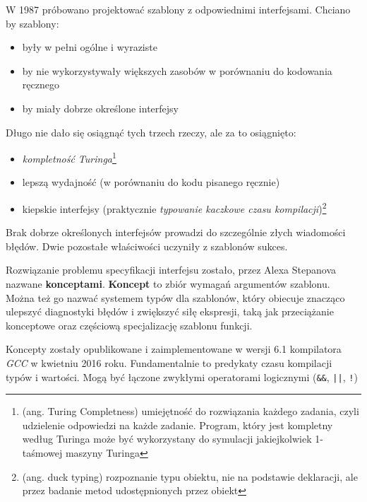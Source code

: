 \documentclass[11pt, a4paper]{article}
\begin{document}
\lstset{language=C++}

W 1987 próbowano projektować szablony z odpowiednimi interfejsami. Chciano by szablony:

\begin{itemize}

\item były w pełni ogólne i wyraziste
\item by nie wykorzystywały większych zasobów w porównaniu do kodowania ręcznego
\item by miały dobrze określone interfejsy

\end{itemize}

\noindent Długo nie dało się osiągnąć tych trzech rzeczy, ale za to osiągnięto:

\begin{itemize}

\item \emph{kompletność Turinga}\footnote{(ang. Turing Completness) umiejętność do rozwiązania każdego zadania, czyli udzielenie odpowiedzi na każde zadanie. Program, który jest kompletny według Turinga może być wykorzystany do symulacji jakiejkolwiek 1-taśmowej maszyny Turinga}
\item lepszą wydajność (w porównaniu do kodu pisanego ręcznie)
\item kiepskie interfejsy (praktycznie \emph{typowanie kaczkowe czasu kompilacji})\footnote{(ang. duck typing) rozpoznanie typu obiektu, nie na podstawie deklaracji, ale przez badanie metod udostępnionych przez obiekt}

\end{itemize}

Brak dobrze określonych interfejsów prowadzi do szczególnie złych wiadomości błędów. Dwie pozostałe właściwości uczyniły z szablonów sukces.

Rozwiązanie problemu specyfikacji interfejsu zostało, przez Alexa Stepanova nazwane \textbf{konceptami}. \textbf{Koncept} to zbiór wymagań argumentów szablonu. Można też go nazwać systemem typów dla szablonów, który obiecuje znacząco ulepszyć diagnostyki błędów i zwiększyć siłę ekspresji, taką jak przeciążanie konceptowe oraz częściową specjalizację szablonu funkcji.

Koncepty zostały opublikowane i zaimplementowane w wersji 6.1 kompilatora \emph{GCC} w kwietniu 2016 roku. Fundamentalnie to predykaty czasu kompilacji typów i wartości. Mogą być łączone zwykłymi operatorami logicznymi (\verb#&&#, \verb#||#, \verb#!#)

\end{document}
